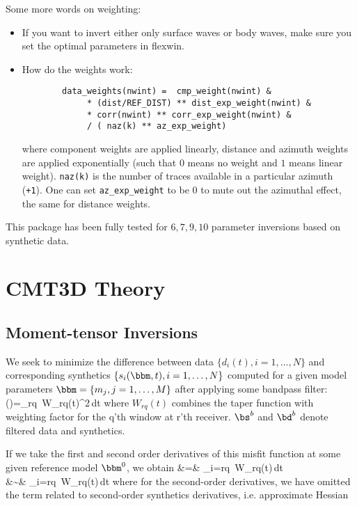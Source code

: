 \documentclass[12pt,titlepage,fleqn]{article}
\begin{document}
Some more words on weighting:
\begin{itemize}
\item If you want to invert either only surface waves or body waves, make sure you set the optimal parameters in flexwin.

\item How do the weights work:
\begin{verbatim}
        data_weights(nwint) =  cmp_weight(nwint) &
             * (dist/REF_DIST) ** dist_exp_weight(nwint) &
             * corr(nwint) ** corr_exp_weight(nwint) & 
             / ( naz(k) ** az_exp_weight)
\end{verbatim}
 where component weights are applied linearly, distance and azimuth weights are applied exponentially (such that $0$ means no weight and $1$ means linear weight). \verb=naz(k)= is the number of traces available in a particular azimuth (\verb=+1=). One can set \verb=az_exp_weight= to be 0 to mute out the azimuthal effect, the same for distance weights.

\end{itemize}
This package has been fully tested for $6,7,9,10$ parameter inversions based on synthetic data.


\appendix
\section{CMT3D Theory}
\subsection{Moment-tensor Inversions}
We seek to minimize the difference between data $\{d_i(t),i=1,\ldots,N\}$ and corresponding synthetics $\{s_i(\bbm,t),i=1,\ldots,N\}$  computed for a given model parameters $\bbm=\{m_j,j=1,\ldots,M\}$ after applying some bandpass filter:
\eq
\phi(\bbm)=\oneovertwo \sum_{rq}  \int\,W_{rq}(t)^2\,dt
\en
where $W_{rq}(t)$ combines the taper function with weighting factor for the q'th window at r'th receiver. $\bs^b$ and $\bd^b$ denote filtered data and synthetics.

If we take the first and second order derivatives of this misfit function at some given reference model $\bbm^0$, we obtain
\eqa
{} &=& \sum_{i=rq} \int\,W_{rq}(t)\,dt \\
 &\sim& \sum_{i=rq}  \int\,W_{rq}(t)\,dt
\label{eq:first-second-der}
\ena
where for the second-order derivatives, we have omitted the term related to second-order synthetics derivatives, i.e. approximate Hessian
\end{document}
